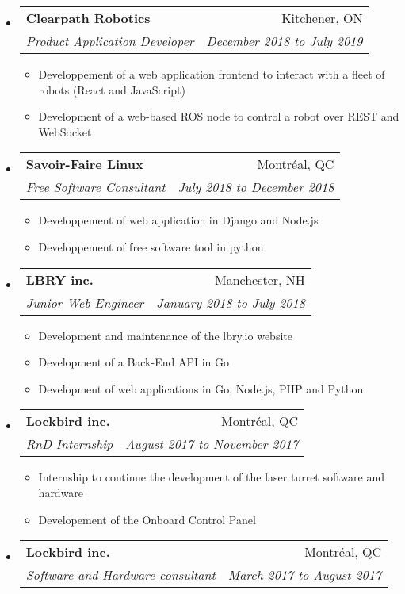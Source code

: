 \documentclass[letterpaper,11pt]{article}
\makeatletter
\newcommand{\ressubheading}[4]{
	\begin{tabular*}{6.5in}{l@{\cftdotfill{\cftsecdotsep}\extracolsep{\fill}}r}
		\textbf{#1} & #2 \\
		\textit{#3} & \textit{#4} \\
	\end{tabular*}\vspace{-6pt}}
\makeatother
\begin{document}
	\begin{itemize}
		
		\item
			\ressubheading{Clearpath Robotics}{Kitchener, ON}{Product Application Developer }{December 2018 to July 2019}
			\begin{itemize}
				\item Developpement of a web application frontend to interact with a fleet of robots (React and JavaScript)
				\item Development of a web-based ROS node to control a robot over REST and WebSocket
			\end{itemize}
		\item
			\ressubheading{Savoir-Faire Linux}{Montréal, QC}{Free Software Consultant}{July 2018 to December 2018}
			
			\begin{itemize}
				\item Developpement of web application in Django and Node.js 
				\item Developpement of free software tool in python
			\end{itemize}
		
		\item
			\ressubheading{LBRY inc.}{Manchester, NH}{Junior Web Engineer}{January 2018 to July 2018}
			
			\begin{itemize}
				\item Development and maintenance of the lbry.io website
				\item Development of a Back-End API in Go
				\item Development of web applications in Go, Node.js, PHP and Python
			\end{itemize}
		
		\item 
			\ressubheading{Lockbird inc.}{Montréal, QC}{RnD Internship}{August 2017 to November 2017}
			
			\begin{itemize}
				\item Internship to continue the development of the laser turret software and hardware
				\item  Developement of the Onboard Control Panel
			\end{itemize}
			
		\item
			\ressubheading{Lockbird inc.}{Montréal, QC}{Software and Hardware consultant}{March 2017 to August 2017}
			

\end{itemize}
\end{document}
